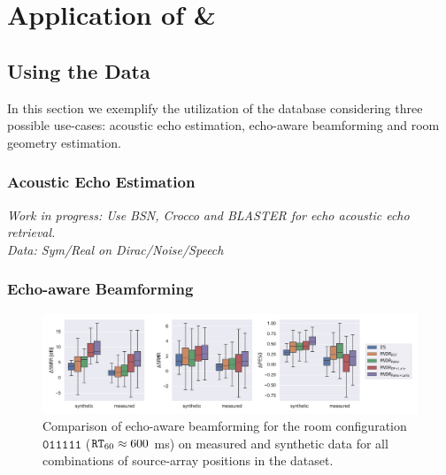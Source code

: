 \chapter{Application of \& }\label{chap:ch:dechorate}

\vspace{-2.5em}

\section{Using the Data}
In this section we exemplify the utilization of the database considering three possible use-cases: acoustic echo estimation, echo-aware beamforming and room geometry estimation.

\subsection{Acoustic Echo Estimation}
\textit{Work in progress:
Use BSN, Crocco and BLASTER for echo acoustic echo retrieval.
\\Data: Sym/Real on Dirac/Noise/Speech}


\subsection{Echo-aware Beamforming}

\begin{figure}[h]
    \centering
    \includegraphics[trim={0 10 10 0},clip,width=\linewidth]
    {figures/dechorate/kowalkzy_results_boxplot.pdf}
    \caption{
    Comparison of echo-aware beamforming for the room configuration $\mathtt{011111}$ ($\mathtt{RT}_{60} \approx 600 $ ms) on measured and synthetic data  for all combinations of source-array positions in the \dEchorate{} dataset.}
    \label{fig:pesq}
\end{figure}

